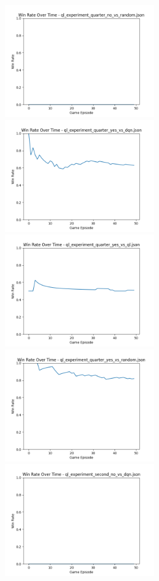 \includegraphics[width=0.5\textwidth]{images/win_rate_ql_experiment_quarter_no_vs_random.png} 
\includegraphics[width=0.5\textwidth]{images/win_rate_ql_experiment_quarter_yes_vs_dqn.png} 
\includegraphics[width=0.5\textwidth]{images/win_rate_ql_experiment_quarter_yes_vs_ql.png} 
\includegraphics[width=0.5\textwidth]{images/win_rate_ql_experiment_quarter_yes_vs_random.png} 
\includegraphics[width=0.5\textwidth]{images/win_rate_ql_experiment_second_no_vs_dqn.png} 
